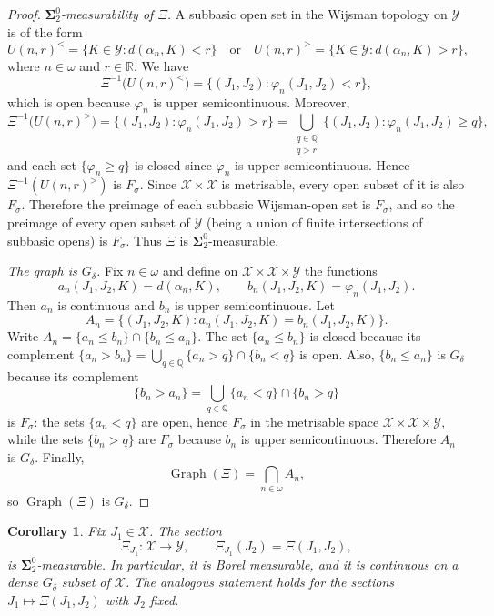 \documentclass[12pt]{amsart}
\renewcommand{\le}{\leqslant}
\renewcommand{\ge}{\geqslant}
\theoremstyle{plain}
\newtheorem{corollary}[theorem]{Corollary}
\theoremstyle{definition}
\theoremstyle{remark}
\DeclareMathOperator{\Graph}{Graph}
\newcommand{\R}{\mathbb{R}}
\newcommand{\bbQ}{\mathbb{Q}}
\begin{document}
\begin{proof}
\medskip
\emph{$\boldsymbol{\Sigma}^0_2$-measurability of $\Xi$.}
A subbasic open set in the Wijsman topology on $\mathscr{Y}$ is of the form
\[
    U(n,r)^{<} = \{K \in \mathscr{Y} \colon d(\alpha_n, K) < r\}
    \quad\text{or}\quad
    U(n,r)^{>} = \{K \in \mathscr{Y} \colon d(\alpha_n, K) > r\},
\]
where $n \in \omega$ and $r \in \R$.  We have
\[
    \Xi^{-1}\bigl(U(n,r)^{<}\bigr)
    = \{(J_1, J_2) \colon \varphi_n(J_1, J_2) < r\},
\]
which is open because $\varphi_n$ is upper semicontinuous.  Moreover,
\[
    \Xi^{-1}\bigl(U(n,r)^{>}\bigr)
    = \{(J_1, J_2) \colon \varphi_n(J_1, J_2) > r\}
    = \bigcup_{\substack{q \in \bbQ \\ q > r}}
      \{(J_1, J_2) \colon \varphi_n(J_1, J_2) \ge q\},
\]
and each set $\{\varphi_n \ge q\}$ is closed since $\varphi_n$ is upper
semicontinuous.  Hence $\Xi^{-1}(U(n,r)^{>})$ is $F_\sigma$.
Since $\mathscr{X} \times \mathscr{X}$ is metrisable, every open subset of it is
also $F_\sigma$. Therefore the preimage of each subbasic Wijsman-open set is
$F_\sigma$, and so the preimage of every open subset of $\mathscr{Y}$ (being a
union of finite intersections of subbasic opens) is $F_\sigma$.
Thus $\Xi$ is $\boldsymbol{\Sigma}^0_2$-measurable.

\medskip
\emph{The graph is $G_\delta$.}
Fix $n \in \omega$ and define on
$\mathscr{X} \times \mathscr{X} \times \mathscr{Y}$ the functions
\[
    a_n(J_1, J_2, K) = d(\alpha_n, K), \qquad
    b_n(J_1, J_2, K) = \varphi_n(J_1, J_2).
\]
Then $a_n$ is continuous and $b_n$ is upper semicontinuous.  Let
\[
    A_n = \{(J_1, J_2, K) \colon a_n(J_1, J_2, K) = b_n(J_1, J_2, K)\}.
\]
Write $A_n = \{a_n \le b_n\} \cap \{b_n \le a_n\}$.
The set $\{a_n \le b_n\}$ is closed because its complement
$\{a_n > b_n\} = \bigcup_{q \in \bbQ} \{a_n > q\} \cap \{b_n < q\}$ is open.
Also, $\{b_n \le a_n\}$ is $G_\delta$ because its complement
\[
    \{b_n > a_n\}
    = \bigcup_{q \in \bbQ} \{a_n < q\} \cap \{b_n > q\}
\]
is $F_\sigma$: the sets $\{a_n < q\}$ are open, hence $F_\sigma$ in the
metrisable space $\mathscr{X} \times \mathscr{X} \times \mathscr{Y}$, while the
sets $\{b_n > q\}$ are $F_\sigma$ because $b_n$ is upper semicontinuous.
Therefore $A_n$ is $G_\delta$.  Finally,
\[
    \Graph(\Xi) = \bigcap_{n \in \omega} A_n,
\]
so $\Graph(\Xi)$ is $G_\delta$.
\end{proof}

\begin{corollary}\label{cor:tensor-sections}
Fix $J_1 \in \mathscr{X}$.  The section
\[
    \Xi_{J_1} \colon \mathscr{X} \to \mathscr{Y}, \qquad
    \Xi_{J_1}(J_2) = \Xi(J_1, J_2),
\]
is $\boldsymbol{\Sigma}^0_2$-measurable.  In particular, it is Borel measurable,
and it is continuous on a dense $G_\delta$ subset of $\mathscr{X}$.
The analogous statement holds for the sections $J_1 \mapsto \Xi(J_1, J_2)$
with $J_2$ fixed.
\end{corollary}
\end{document}
